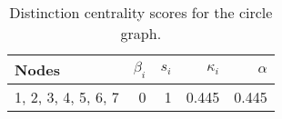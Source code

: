 \begin{table}
\centering
\caption{\label{tab:circle}Distinction centrality scores for the circle graph.}
\centering
\begin{tabular}[t]{lrrrr}
\toprule
Nodes & $\beta_i$ & $s_i$ & $\kappa_i$ & $\alpha$\\
\midrule
1, 2, 3, 4, 5, 6, 7 & 0 & 1 & 0.445 & 0.445\\
\bottomrule
\end{tabular}
\end{table}
